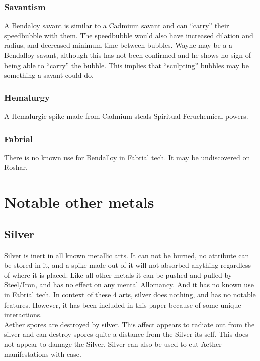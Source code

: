 \documentclass[conference]{IEEEtran}
\newcommand{\n}{\hfill\break}
\begin{document}
\subsubsection*{\textbf{Savantism}}
A Bendaloy savant is similar to a Cadmium savant and can ``carry'' their speedbubble with them.\cite{Bubble-move}  The speedbubble would also have increased dilation and radius,\cite{bubble-savant} and decreased minimum time between bubbles.\cite{TLM-CH8}  Wayne may be a a Bendalloy savant, although this has not been confirmed and he shows no sign of being able to ``carry'' the bubble.\cite{TLM-CH8}\cite{TLM-CH49}\cite{TLM-CH71} This implies that ``sculpting'' bubbles may be something a savant could do.\\
\subsubsection*{\textbf{Hemalurgy}}
A Hemalurgic spike made from Cadmium steals Spiritual Feruchemical powers.\cite{HE-TB}\\
\subsubsection*{\textbf{Fabrial}}
There is no known use for Bendalloy in Fabrial tech.  It may be undiscovered on Roshar.
\n
\section{\textbf{Notable other metals}}
\subsection*{\textbf{Silver}}
Silver is inert in all known metallic arts.\cite{HoA-CH60}  It can not be burned,\cite{AL-TB} no attribute can be stored in it,\cite{FE-TB} and a spike made out of it will not absorbed anything regardless of where it is placed.\cite{HE-TB}  Like all other metals it can be pushed and pulled by Steel/Iron,\cite{SoS-CH2} and has no effect on any mental Allomancy.\cite{silver-no-special}  And it has no known use in Fabrial tech.  In context of these 4 arts, silver does nothing, and has no notable features.\cite{no-silver-al}  However, it has been included in this paper because of some unique interactions. \\

Aether spores are destroyed by silver.\cite{ToES-CH1}  This affect appears to radiate out from the silver and can destroy spores quite a distance from the Silver its self.\cite{ToES-CH10}  This does not appear to damage the Silver.  Silver can also be used to cut Aether manifestations with ease.\\
\end{document}
